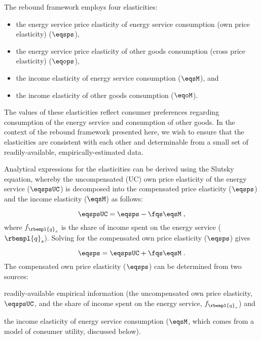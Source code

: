 

The rebound framework employs four elasticities:
%
\begin{itemize}

  \item the energy service price elasticity of energy service consumption (own price elasticity) ($\eqsps$),

  \item the energy service price elasticity of other goods consumption (cross price elasticity) ($\eqops$), 
  
  \item the income elasticity of energy service consumption ($\eqsM$), and 
  
  \item the income elasticity of other goods consumption ($\eqoM$).

\end{itemize}
%
The values of these elasticities reflect consumer preferences regarding 
consumption of the energy service and consumption of other goods.
In the context of the rebound framework presented here, 
we wish to ensure that the elasticities are consistent with each other
and determinable from a small set 
of readily-available, empirically-estimated data. 

Analytical expressions for the elasticities can be derived using the Slutsky equation, 
whereby the uncompensated (UC) own price elasticity 
of the energy service ($\eqspsUC$) 
is decomposed into the compensated price elasticity ($\eqsps$) and
the income elasticity ($\eqsM$) as follows:

\begin{equation}
  \eqspsUC = \eqsps - \fqs \eqsM \; ,
\end{equation}
%
where $f_{\rbempl{q}_s}$ is the share of income spent 
on the energy service ($\rbempl{q}_s$). 
Solving for the compensated own price elasticity ($\eqsps$) gives

\begin{equation} \label{eq:eqsps}
  \eqsps = \eqspsUC + \fqs \eqsM \; .
\end{equation}
%
The compensated own price elasticity ($\eqsps$)
can be determined from two sources:
%
\begin{enumerate*}[label={(\alph*)}]
	
  \item readily-available empirical information
        (the uncompensated own price elasticity, $\eqspsUC$, and 
        the share of income spent on the energy service, $f_{\rbempl{q}_s}$)
        and 
  
  \item the income elasticity of energy service consumption 
        ($\eqsM$, which comes from a model of consumer utility, discussed below).
    
\end{enumerate*}

